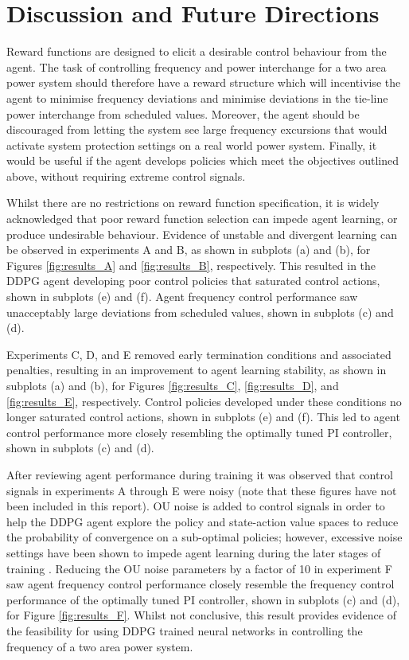 \chapter{Discussion and Future Directions}

Reward functions are designed to elicit a desirable control behaviour from the agent. The task of controlling frequency and power interchange for a two area power system should therefore have a reward structure which will incentivise the agent to minimise frequency deviations and minimise deviations in the tie-line power interchange from scheduled values. Moreover, the agent should be discouraged from letting the system see large frequency excursions that would activate system protection settings on a real world power system. Finally, it would be useful if the agent develops policies which meet the objectives outlined above, without requiring extreme control signals.

Whilst there are no restrictions on reward function specification, it is widely acknowledged that poor reward function selection can impede agent learning, or produce undesirable behaviour. Evidence of unstable and divergent learning can be observed in experiments A and B, as shown in subplots (a) and (b), for Figures \ref{fig:results_A} and \ref{fig:results_B}, respectively. This resulted in the DDPG agent developing poor control policies that saturated control actions, shown in subplots (e) and (f). Agent frequency control performance saw unacceptably large deviations from scheduled values, shown in subplots (c) and (d).

Experiments C, D, and E removed early termination conditions and associated penalties, resulting in an improvement to agent learning stability, as shown in subplots (a) and (b), for Figures \ref{fig:results_C}, \ref{fig:results_D}, and \ref{fig:results_E}, respectively. Control policies developed under these conditions no longer saturated control actions, shown in subplots (e) and (f). This led to agent control performance more closely resembling the optimally tuned PI controller, shown in subplots (c) and (d).

After reviewing agent performance during training it was observed that control signals in experiments A through E were noisy (note that these figures have not been included in this report). OU noise is added to control signals in order to help the DDPG agent explore the policy and state-action value spaces to reduce the probability of convergence on a sub-optimal policies; however, excessive noise settings have been shown to impede agent learning during the later stages of training \cite{}. Reducing the OU noise parameters by a factor of 10 in experiment F saw agent frequency control performance closely resemble the frequency control performance of the optimally tuned PI controller, shown in subplots (c) and (d), for Figure \ref{fig:results_F}. Whilst not conclusive, this result provides evidence of the feasibility for using DDPG trained neural networks in controlling the frequency of a two area power system.

